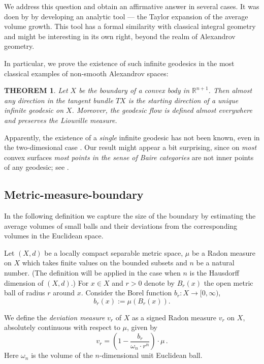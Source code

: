 \documentclass[12pt,leqno,intlimits]{amsart}
\numberwithin{equation}{section}
\newtheorem{thm}{THEOREM}[section]
\theoremstyle{definition}
\theoremstyle{remark}
\def\:{\colon}
\begin{document}
We address this question and obtain an affirmative answer in several cases.
It was doen by by developing an analytic tool --- the Taylor expansion of the average volume growth.
This tool has a formal similarity with classical integral geometry
and might be interesting in its own right, beyond the realm of Alexandrov geometry.

In particular, we prove the existence of such infinite geodesics in the most classical examples of non-smooth Alexandrov spaces:

\begin{thm} \label{thmfirst}
Let $X$ be the boundary of a convex body in $\mathbb R^{n+1}$.
Then almost any direction in the tangent bundle $TX$
is the starting direction of a unique infinite geodesic on $X$.
Moreover, the geodesic flow is defined almost everywhere and preserves the Liouville measure.
\end{thm}

Apparently, the existence of a \emph{single} infinite geodesic has not been known, even in the two-dimesional case \cite{Zam-quest}.
Our result might appear a bit surprising,
since on \emph{most} convex surfaces \emph{most points in the sense of Baire categories} are not inner points of any geodesic;
see \cite{Zam-inv}.

\subsection{Metric-measure-boundary}
In the following definition we capture the size of the boundary by estimating the average volumes of small balls and their deviations from the corresponding volumes in the Euclidean space.

Let $(X,d)$ be a locally compact separable metric space,
$\mu$ be a Radon measure on $X$ which takes finite values on the bounded subsets
and $n$ be a natural number.%
(The definition will be applied in the case when $n$ is the Hausdorff dimension of $(X,d)$.)
For $x\in X$ and $r>0$
denote by $B_r (x)$ the open metric ball of radius $r$ around $x$. Consider the Borel function $b_r\:X\to [0,\infty )$,
\begin{equation}
b_r(x):=\mu (B_r (x)).
\end{equation}

We define the \emph{deviation measure} $v_r$ of $X$ as a signed Radon measure $v_r$ on $X$, absolutely continuous with respect to $\mu$, given by
\begin{equation} \label{eq:first}
v_r = (1 - \frac {b_r} { \omega _n{\cdot}r^n} )\cdot \mu \, .
\end{equation}
Here $\omega _n$ is the volume of the $n$-dimensional unit Euclidean ball.
\end{document}
